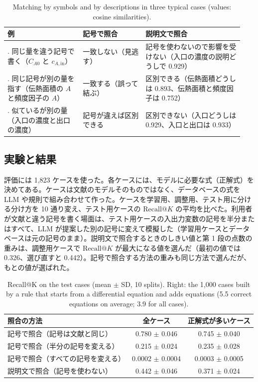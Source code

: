 \documentclass[a4j,dvipdfmx,10pt]{jresume}
\makeatletter
\newcommand{\rk}{\textrm{Recall@}K}
\makeatother
\begin{document}
\begin{table}[t]\centering
\footnotesize
\caption{Matching by symbols and by descriptions in three typical cases (values: cosine similarities).}
\label{tab:compare}
\begin{tabular}{@{}>{\raggedright\arraybackslash}p{0.30\linewidth}>{\raggedright\arraybackslash}p{0.25\linewidth}>{\raggedright\arraybackslash}p{0.39\linewidth}@{}}
\toprule
例 & 記号で照合 & 説明文で照合 \\
\midrule
1. 同じ量を違う記号で書く（$C_{A0}$ と $c_{A,\mathrm{in}}$） & 一致しない（見逃す） & 記号を使わないので影響を受けない（入口の濃度の説明どうしで 0.929） \\
\addlinespace
2. 同じ記号が別の量を指す（伝熱面積の $A$ と頻度因子の $A$） & 一致する（誤って結ぶ） & 区別できる（伝熱面積どうしは 0.893、伝熱面積と頻度因子は 0.752） \\
\addlinespace
3. 似ているが別の量（入口の濃度と出口の濃度） & 記号が違えば区別できる & 区別できない（入口どうしは 0.929、入口と出口は 0.933） \\
\bottomrule
\end{tabular}
\end{table}

\subsection{実験と結果}\label{sec:result}
評価には 1{,}823 ケースを使った。各ケースには、モデルに必要な式（正解式）を決めてある。ケースは文献のモデルそのものではなく、データベースの式を LLM や規則で組み合わせて作った。ケースを学習用、調整用、テスト用に分ける分け方を 10 通り変え、テスト用ケースの $\rk$ の平均を比べた。利用者が文献と違う記号を書く場面は、テスト用ケースの入出力変数の記号を半分またはすべて、LLM が提案した別の記号に変えて模擬した（学習用ケースとデータベースは元の記号のまま）。説明文で照合するときのしきい値と第 1 段の点数の重みは、調整用ケースで $\rk$ が最大になる値を選んだ（最初の値では 0.326、選び直すと 0.442）。記号で照合する方法の重みも同じ方法で選んだが、もとの値が選ばれた。

\begin{table}[t]\centering
\footnotesize
\caption{Recall@K on the test cases (mean $\pm$ SD, 10 splits). Right: the 1,000 cases built by a rule that starts from a differential equation and adds equations (5.5 correct equations on average; 3.9 for all cases).}
\label{tab:result}
\begin{tabular}{@{}lcc@{}}
\toprule
照合の方法 & 全ケース & 正解式が多いケース \\
\midrule
記号で照合（記号は文献と同じ） & 0.780 $\pm$ 0.046 & 0.745 $\pm$ 0.040 \\
記号で照合（半分の記号を変える） & 0.215 $\pm$ 0.024 & 0.235 $\pm$ 0.028 \\
記号で照合（すべての記号を変える） & 0.0002 $\pm$ 0.0004 & 0.0003 $\pm$ 0.0005 \\
説明文で照合（記号を使わない） & 0.442 $\pm$ 0.046 & 0.371 $\pm$ 0.024 \\
\bottomrule
\end{tabular}
\end{table}
\end{document}
